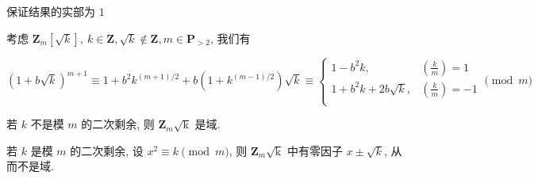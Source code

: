 保证结果的实部为 \(1\)

考虑 \(\mathbf{Z}_m\left[\sqrt{k}\right],~k\in\mathbf{Z},\sqrt{k}\notin \mathbf{Z},m\in\mathbf{P}_{>2}\), 我们有

\[
    \left(1+b\sqrt{k}\right)^{m+1}\equiv 1+b^2 k^{(m+1)/2} + b\left(1+k^{(m-1)/2}\right)\sqrt{k} \equiv\begin{cases}
        1-b^2 k,              & \left(\frac{k}{m}\right)=1 \\
        1+b^2 k + 2b\sqrt{k}, & \left(\frac{k}{m}\right)=-1 \\
    \end{cases} \pmod m
\]

若 \(k\) 不是模 \(m\) 的二次剩余, 则 \(\mathbf{Z}_m\mathrm{\sqrt{k}}\) 是域.

若 \(k\) 是模 \(m\) 的二次剩余, 设 \(x^2\equiv k\pmod m\), 则 \(\mathbf{Z}_m\mathrm{\sqrt{k}}\) 中有零因子 \(x\pm\sqrt{k}\), 从而不是域.
